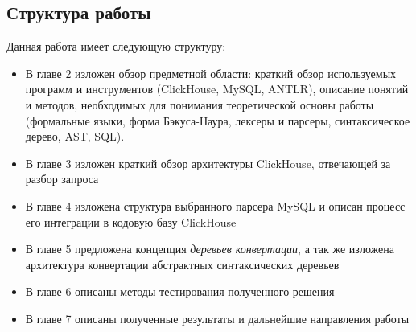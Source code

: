 \subsection{Структура работы}
Данная работа имеет следующую структуру:
\begin{itemize}
    \item В главе 2 изложен обзор предметной области: краткий обзор используемых программ и инструментов (ClickHouse, MySQL, ANTLR), описание понятий и методов, необходимых для понимания теоретической основы работы (формальные языки, форма Бэкуса-Наура, лексеры и парсеры, синтаксическое дерево, AST, SQL).
    \item В главе 3 изложен краткий обзор архитектуры ClickHouse, отвечающей за разбор запроса
    \item В главе 4 изложена структура выбранного парсера MySQL и описан процесс его интеграции в кодовую базу ClickHouse
    \item В главе 5 предложена концепция \textit{деревьев конвертации}, а так же изложена архитектура конвертации абстрактных синтаксических деревьев
    \item В главе 6 описаны методы тестирования полученного решения
    \item В главе 7 описаны полученные результаты и дальнейшие направления работы
\end{itemize}
